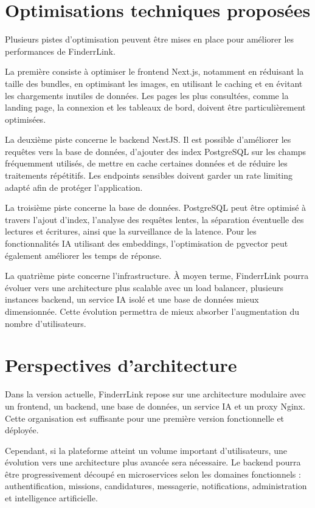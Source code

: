 \section{Optimisations techniques proposées}

Plusieurs pistes d'optimisation peuvent être mises en place pour améliorer les performances de FinderrLink.

La première consiste à optimiser le frontend Next.js, notamment en réduisant la taille des bundles, en optimisant les images, en utilisant le caching et en évitant les chargements inutiles de données. Les pages les plus consultées, comme la landing page, la connexion et les tableaux de bord, doivent être particulièrement optimisées.

La deuxième piste concerne le backend NestJS. Il est possible d'améliorer les requêtes vers la base de données, d'ajouter des index PostgreSQL sur les champs fréquemment utilisés, de mettre en cache certaines données et de réduire les traitements répétitifs. Les endpoints sensibles doivent garder un rate limiting adapté afin de protéger l'application.

La troisième piste concerne la base de données. PostgreSQL peut être optimisé à travers l'ajout d'index, l'analyse des requêtes lentes, la séparation éventuelle des lectures et écritures, ainsi que la surveillance de la latence. Pour les fonctionnalités IA utilisant des embeddings, l'optimisation de pgvector peut également améliorer les temps de réponse.

La quatrième piste concerne l'infrastructure. À moyen terme, FinderrLink pourra évoluer vers une architecture plus scalable avec un load balancer, plusieurs instances backend, un service IA isolé et une base de données mieux dimensionnée. Cette évolution permettra de mieux absorber l'augmentation du nombre d'utilisateurs.

\section{Perspectives d'architecture}

Dans la version actuelle, FinderrLink repose sur une architecture modulaire avec un frontend, un backend, une base de données, un service IA et un proxy Nginx. Cette organisation est suffisante pour une première version fonctionnelle et déployée.

Cependant, si la plateforme atteint un volume important d'utilisateurs, une évolution vers une architecture plus avancée sera nécessaire. Le backend pourra être progressivement découpé en microservices selon les domaines fonctionnels : authentification, missions, candidatures, messagerie, notifications, administration et intelligence artificielle.

